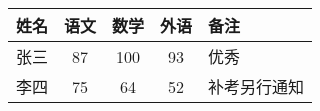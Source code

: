 \documentclass[UTF8]{ctexart}
\begin{document}
\begin{tabular}{| l || c | c | c | p{1.5cm} |}
\hline
姓名 & 语文 & 数学 & 外语 & 备注 \\
\hline \hline
张三 & 87 & 100 & 93 & 优秀\\
\hline
李四 & 75 & 64 & 52 & 补考另行通知\\
\hline
\end{tabular}    
\end{document}
